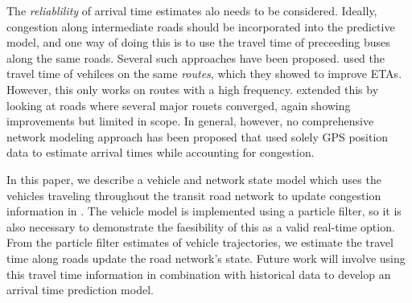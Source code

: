 The \emph{reliablility} of arrival time estimates
alo needs to be considered.
Ideally, congestion along intermediate roads should be incorporated into the predictive model,
and one way of doing this is to use the travel time of preceeding buses along the same roads.
Several such approaches have been proposed.
\cite{Yu_2010} used the travel time of vehilces on the same \emph{routes},
which they showed to improve ETAs.
However, this only works on routes with a high frequency.
\citep{Yu_2011} extended this by looking at roads where several major rouets converged,
again showing improvements but limited in scope.
In general, however, no comprehensive network modeling approach has been proposed that used
solely GPS position data to estimate arrival times
while accounting for congestion.


In this paper, we describe a \rt vehicle and network state
model which uses the vehicles traveling throughout the transit road network
to update congestion information in \rt.
The vehicle model is implemented using a particle filter,
so it is also necessary to demonstrate the faesibility of this as a valid real-time option.
From the particle filter estimates of vehicle trajectories,  
we estimate the travel time along roads update the road network's state.
Future work will involve using this travel time information 
in combination with historical data to develop an arrival time prediction model.




